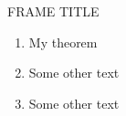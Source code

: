\documentclass{beamer}
\begin{document}
\begin{frame}{FRAME TITLE}
    \begin{enumerate}[Step 1]
        \item \begin{minipage}[t]{\linewidth}
                    \vspace*{-1.1\baselineskip}
               \begin{theorem}
                       My theorem
                   \end{theorem}
        \end{minipage}
        \item Some other text
        \item Some other text
    \end{enumerate}
\end{frame}
\end{document}
